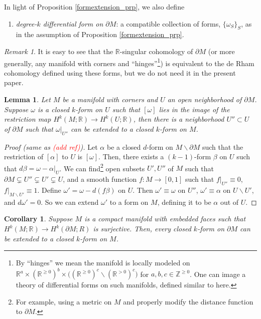 \documentclass[11pt]{article}
\newtheorem{lmm}[thm]{Lemma}
\newtheorem{crl}[thm]{Corollary}
\theoremstyle{definition}
\theoremstyle{remark}
\newtheorem{rmk}[thm]{Remark}
\def\Z{\mathbb{Z}}
\def\R{\mathbb{R}}
\begin{document}
\begin{appendices}
In light of Proposition \ref{formextension_prp}, we also define
\begin{enumerate}[label=$\cdot$, nolistsep]
\item {\it degree-$k$ differential form on $\partial M$}: a compatible collection of forms, $\{\omega_S\}_S$, as in the assumption of Proposition \ref{formextension_prp}. 
\end{enumerate}
\begin{rmk}
It is easy to see that the $\R$-singular cohomology of $\partial M$ (or more generally, any manifold with corners and ``hinges''\footnote{By ``hinges'' we mean the manifold is locally modeled on $\R^a\times(\R^{\ge0})^b\times\big((\R^{\ge0})^c\backslash(\R^{>0})^c\big)$ for $a,b,c\in\Z^{\ge0}$. One can image a theory of differential forms on such manifolds, defined similar to here.}) is equivalent to the de Rham cohomology defined using these forms, but we do not need it in the present paper.
\end{rmk}


\begin{lmm}\label{formextension_lmm}
Let $M$ be a manifold with corners and $U$ an open neighborhood of $\partial M$. 
Suppose $\omega$ is a closed $k$-form on $U$ such that $[\omega]$ lies in the image of the restriction map $H^k(M;\R)\to H^k(U;\R)$, 
then there is a neighborhood $U''\subset U$ of $\partial M$ such that $\omega|_{U''}$ can be extended to a closed $k$-form on $M$. 
\end{lmm}

\begin{proof}[Proof (same as \textcolor{red}{(add ref)})]
Let $\alpha$ be a closed $d$-form on $M\backslash{\partial M}$ such that the restriction of $[\alpha]$ to $U$ is $[\omega]$. 
Then, there exists a $(k-1)$-form $\beta$ on $U$ such that $d\beta=\omega-\alpha|_{U}$. 
We can find\footnote{For example, using a metric on $M$ and properly modify the distance function to $\partial M$.} open subsets $U',U''$ of $M$ such that $\partial M\subsetneq U''\subsetneq U'\subsetneq U$, and a smooth function $f:M\to[0,1]$ such that $f|_{U''}\equiv 0$, $f|_{M\backslash U'}\equiv1$. 
Define $\omega'=\omega-d(f\beta)$ on $U$. Then $\omega'\equiv\omega$ on $U''$, $\omega'\equiv\alpha$ on $U\backslash U'$, and $d\omega'=0$. So we can extend $\omega'$ to a form on $M$, defining it to be $\alpha$ out of $U$. 
\end{proof}

\begin{crl}\label{formextension_crl}
Suppose $M$ is a compact manifold with embedded faces such that $H^k(M;\R)\to H^k(\partial M;R)$ is surjective. Then, every closed $k$-form on $\partial M$ can be extended to a closed $k$-form on $M$. 
\end{crl}


\end{appendices}
\end{document}
